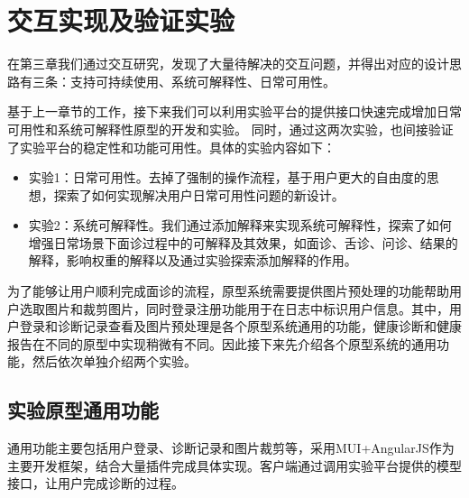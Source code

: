 \chapter{交互实现及验证实验}


在第三章我们通过交互研究，发现了大量待解决的交互问题，并得出对应的设计思路有三条：支持可持续使用、系统可解释性、日常可用性。




基于上一章节的工作，接下来我们可以利用实验平台的提供接口快速完成增加日常可用性和系统可解释性原型的开发和实验。
同时，通过这两次实验，也间接验证了实验平台的稳定性和功能可用性。具体的实验内容如下：

\begin{itemize}
	\item 实验1：日常可用性。去掉了强制的操作流程，基于用户更大的自由度的思想，探索了如何实现解决用户日常可用性问题的新设计。

	\item 实验2：系统可解释性。我们通过添加解释来实现系统可解释性，探索了如何增强日常场景下面诊过程中的可解释及其效果，如面诊、舌诊、问诊、结果的解释，影响权重的解释以及通过实验探索添加解释的作用。
	
\end{itemize}

为了能够让用户顺利完成面诊的流程，原型系统需要提供图片预处理的功能帮助用户选取图片和裁剪图片，同时登录注册功能用于在日志中标识用户信息。其中，用户登录和诊断记录查看及图片预处理是各个原型系统通用的功能，健康诊断和健康报告在不同的原型中实现稍微有不同。因此接下来先介绍各个原型系统的通用功能，然后依次单独介绍两个实验。

\section{实验原型通用功能}
通用功能主要包括用户登录、诊断记录和图片裁剪等，采用MUI+AngularJS作为主要开发框架，结合大量插件完成具体实现。客户端通过调用实验平台提供的模型接口，让用户完成诊断的过程。

